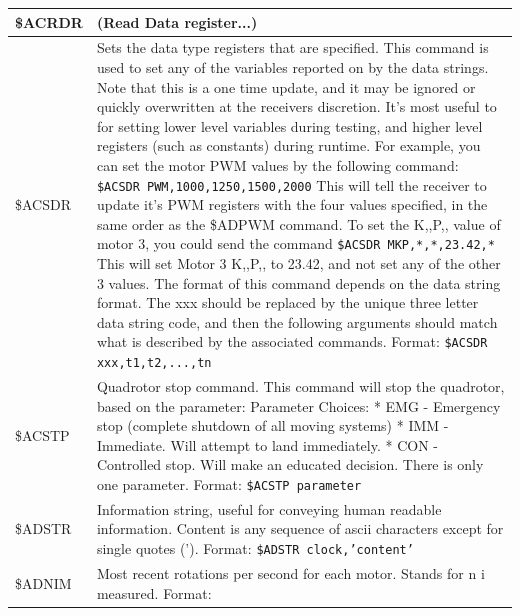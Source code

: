 \documentclass{article}
\numberwithin{equation}{section} %
\begin{document}
\begin{longtable}{p{2cm}p{9cm}}
\hline
\$ACRDR &
(Read Data register...) \\
\hline
\$ACSDR &
Sets the data type registers that are specified. This command is used to set any of the variables reported on by the data strings. Note that this is a one time update, and it may be ignored or quickly overwritten at the receivers discretion. It's most useful to for setting lower level variables during testing, and higher level registers (such as constants) during runtime. \newline
For example, you can set the motor PWM values by the following command: \newline
\texttt{\$ACSDR PWM,1000,1250,1500,2000} \newline
This will tell the receiver to update it's PWM registers with the four values specified, in the same order as the \$ADPWM command. 
To set the K,,P,, value of motor 3, you could send the command
\texttt{\$ACSDR MKP,*,*,23.42,*} \newline
This will set Motor 3 K,,P,, to 23.42, and not set any of the other 3 values.
The format of this command depends on the data string format. The xxx should be replaced by the unique three letter data string code, and then the following arguments should match what is described by the associated commands.
\newline
Format:\newline
\texttt{\$ACSDR xxx,t1,t2,...,tn} \\
\hline
\$ACSTP &
Quadrotor stop command. This command will stop the quadrotor, based on the parameter:
Parameter Choices:
  * EMG - Emergency stop (complete shutdown of all moving systems)
  * IMM - Immediate. Will attempt to land immediately.
  * CON - Controlled stop. Will make an educated decision.
There is only one parameter. 
\newline
Format:\newline
\texttt{\$ACSTP parameter} \\
\hline
\$ADSTR &
Information string, useful for conveying human readable information. Content is any sequence of ascii characters except for single quotes (').
\newline
Format:\newline
\texttt{\$ADSTR clock,'content'} \\
\hline
\$ADNIM &
Most recent rotations per second for each motor. Stands for n i measured.
\newline
Format:\newline

\end{longtable}
\end{document}
